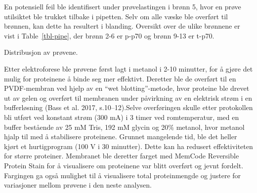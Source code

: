 \documentclass[
  letterpaper,
  DIV=11,
  numbers=noendperiod]{scrreprt}
\begin{document}
En potensiell feil ble identifisert under prøvelastingen i brønn 5, hvor
en prøve utilsiktet ble trukket tilbake i pipetten. Selv om alle væske
ble overført til brønnen, kan dette ha resultert i blanding. Oversikt
over de ulike brønnene er vist i Table~\ref{tbl-pipe}, der brønn 2-6 er
p-p70 og brønn 9-13 er t-p70.

\begin{table}

\caption{\label{tbl-pipe}Distribusjon av prøvene.}


\end{table}%

Etter elektroforese ble prøvene først lagt i metanol i 2-10 minutter,
for å gjøre det mulig for proteinene å binde seg mer effektivt. Deretter
ble de overført til en PVDF-membran ved hjelp av en ``wet
blotting''-metode, hvor proteine ble drevet ut av gelen og overført til
membranen under påvirkning av en elektrisk strøm i en bufferløsning
(Bass et al. 2017, s.10--12).Selve overføringen skulle etter protokollen
bli utført ved konstant strøm (300 mA) i 3 timer ved romtemperatur, med
en buffer bestående av 25 mM Tris, 192 mM glycin og 20\% metanol, hvor
metanol hjalp til med å stabilisere proteinene. Grunnet mangelende tid,
ble det heller kjørt et hurtigprogram (100 V i 30 minutter). Dette kan
ha redusert effektiviteten for større proteiner. Membranet ble deretter
farget med MemCode Reversible Protein Stain for å visualisere om
proteinene var blitt overført og jevnt fordelt. Fargingen ga også
mulighet til å visualisere total proteinmengde og justere for
variasjoner mellom prøvene i den neste analysen.
\end{document}
